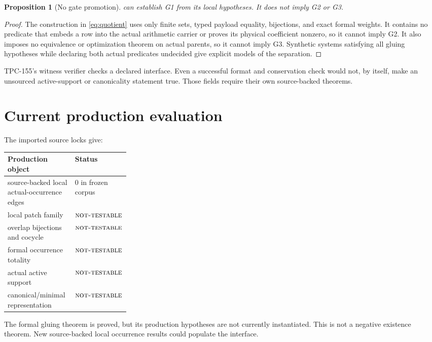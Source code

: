 \documentclass[11pt]{article}
\newtheorem{proposition}[theorem]{Proposition}
\theoremstyle{definition}
\theoremstyle{remark}
\newcommand{\NT}{\textnormal{\textsc{not-testable}}}
\begin{document}
\begin{proposition}[No gate promotion]\label{prop:no-promotion}
 can establish G1 from its local hypotheses.  It does
not imply G2 or G3.
\end{proposition}

\begin{proof}
The construction in \eqref{eq:quotient} uses only finite sets, typed
payload equality, bijections, and exact formal weights.  It contains
no predicate that embeds a row into the actual arithmetic carrier or
proves its physical coefficient nonzero, so it cannot imply G2.  It
also imposes no equivalence or optimization theorem on actual
parents, so it cannot imply G3.  Synthetic systems satisfying all
gluing hypotheses while declaring both actual predicates undecided
give explicit models of the separation.
\end{proof}

TPC-155's witness verifier \citep{WangTPC155} checks a declared
interface.  Even a successful format and conservation check would
not, by itself, make an unsourced active-support or canonicality
statement true.  Those fields require their own source-backed
theorems.

\section{Current production evaluation}

The imported source locks give:
\begin{center}
\begin{tabularx}{0.9\linewidth}{@{}Y P{0.28\linewidth}@{}}
\toprule
\textbf{Production object} & \textbf{Status}\\
\midrule
source-backed local actual-occurrence edges & \(0\) in frozen corpus\\
local patch family & \(\NT\)\\
overlap bijections and cocycle & \(\NT\)\\
formal occurrence totality & \(\NT\)\\
actual active support & \(\NT\)\\
canonical/minimal representation & \(\NT\)\\
\bottomrule
\end{tabularx}
\end{center}
The formal gluing theorem is proved, but its production hypotheses
are not currently instantiated.  This is not a negative existence
theorem.  New source-backed local occurrence results could populate
the interface.
\end{document}
